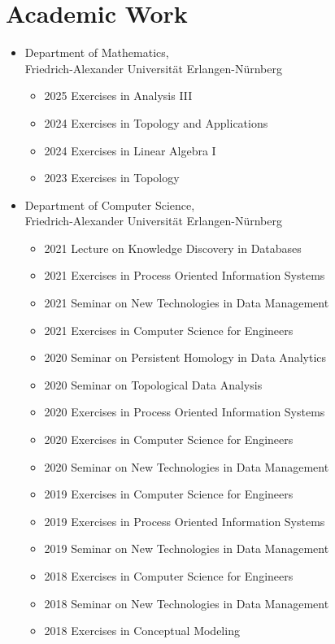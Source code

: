 \documentclass[a4paper, 11pt]{article}
\newcommand{\years}[1]{\marginnote{\scriptsize #1}}
\begin{document}
\section*{Academic Work}
\years{Teaching}
\vspace{-2pt}
\begin{itemize}[noitemsep, leftmargin=*]
	\item Department of Mathematics, \\
	      Friedrich-Alexander Universität Erlangen-Nürnberg
	      \begin{itemize}
	      	\item 2025 Exercises in Analysis III
	      	\item 2024 Exercises in Topology and Applications
	      	\item 2024 Exercises in Linear Algebra I
	      	\item 2023 Exercises in Topology
	      \end{itemize}
	\item Department of Computer Science, \\
	      Friedrich-Alexander Universität Erlangen-Nürnberg
	      \begin{itemize}
	      	\item 2021 Lecture on Knowledge Discovery in Databases
	      	\item 2021 Exercises in Process Oriented Information Systems
	      	\item 2021 Seminar on New Technologies in Data Management
	      	\item 2021 Exercises in Computer Science for Engineers
	      	\item 2020 Seminar on Persistent Homology in Data Analytics
	      	\item 2020 Seminar on Topological Data Analysis
	      	\item 2020 Exercises in Process Oriented Information Systems
	      	\item 2020 Exercises in Computer Science for Engineers
	      	\item 2020 Seminar on New Technologies in Data Management
	      	\item 2019 Exercises in Computer Science for Engineers
	      	\item 2019 Exercises in Process Oriented Information Systems
	      	\item 2019 Seminar on New Technologies in Data Management
	      	\item 2018 Exercises in Computer Science for Engineers
	      	\item 2018 Seminar on New Technologies in Data Management
	      	\item 2018 Exercises in Conceptual Modeling
	      \end{itemize}
\end{itemize}
\vspace{10pt}
\end{document}
